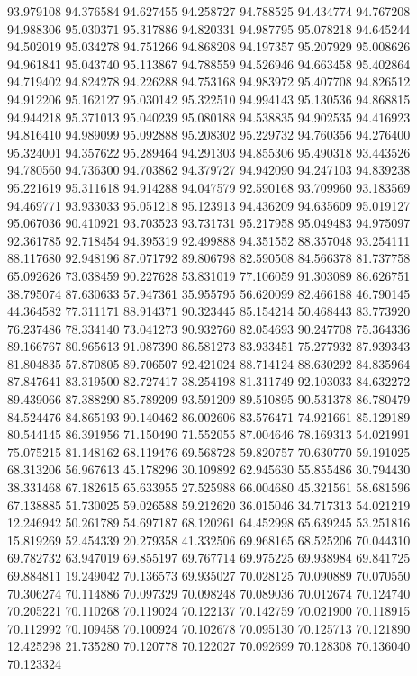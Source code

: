 93.979108
94.376584
94.627455
94.258727
94.788525
94.434774
94.767208
94.988306
95.030371
95.317886
94.820331
94.987795
95.078218
94.645244
94.502019
95.034278
94.751266
94.868208
94.197357
95.207929
95.008626
94.961841
95.043740
95.113867
94.788559
94.526946
94.663458
95.402864
94.719402
94.824278
94.226288
94.753168
94.983972
95.407708
94.826512
94.912206
95.162127
95.030142
95.322510
94.994143
95.130536
94.868815
94.944218
95.371013
95.040239
95.080188
94.538835
94.902535
94.416923
94.816410
94.989099
95.092888
95.208302
95.229732
94.760356
94.276400
95.324001
94.357622
95.289464
94.291303
94.855306
95.490318
93.443526
94.780560
94.736300
94.703862
94.379727
94.942090
94.247103
94.839238
95.221619
95.311618
94.914288
94.047579
92.590168
93.709960
93.183569
94.469771
93.933033
95.051218
95.123913
94.436209
94.635609
95.019127
95.067036
90.410921
93.703523
93.731731
95.217958
95.049483
94.975097
92.361785
92.718454
94.395319
92.499888
94.351552
88.357048
93.254111
88.117680
92.948196
87.071792
89.806798
82.590508
84.566378
81.737758
65.092626
73.038459
90.227628
53.831019
77.106059
91.303089
86.626751
38.795074
87.630633
57.947361
35.955795
56.620099
82.466188
46.790145
44.364582
77.311171
88.914371
90.323445
85.154214
50.468443
83.773920
76.237486
78.334140
73.041273
90.932760
82.054693
90.247708
75.364336
89.166767
80.965613
91.087390
86.581273
83.933451
75.277932
87.939343
81.804835
57.870805
89.706507
92.421024
88.714124
88.630292
84.835964
87.847641
83.319500
82.727417
38.254198
81.311749
92.103033
84.632272
89.439066
87.388290
85.789209
93.591209
89.510895
90.531378
86.780479
84.524476
84.865193
90.140462
86.002606
83.576471
74.921661
85.129189
80.544145
86.391956
71.150490
71.552055
87.004646
78.169313
54.021991
75.075215
81.148162
68.119476
69.568728
59.820757
70.630770
59.191025
68.313206
56.967613
45.178296
30.109892
62.945630
55.855486
30.794430
38.331468
67.182615
65.633955
27.525988
66.004680
45.321561
58.681596
67.138885
51.730025
59.026588
59.212620
36.015046
34.717313
54.021219
12.246942
50.261789
54.697187
68.120261
64.452998
65.639245
53.251816
15.819269
52.454339
20.279358
41.332506
69.968165
68.525206
70.044310
69.782732
63.947019
69.855197
69.767714
69.975225
69.938984
69.841725
69.884811
19.249042
70.136573
69.935027
70.028125
70.090889
70.070550
70.306274
70.114886
70.097329
70.098248
70.089036
70.012674
70.124740
70.205221
70.110268
70.119024
70.122137
70.142759
70.021900
70.118915
70.112992
70.109458
70.100924
70.102678
70.095130
70.125713
70.121890
12.425298
21.735280
70.120778
70.122027
70.092699
70.128308
70.136040
70.123324
